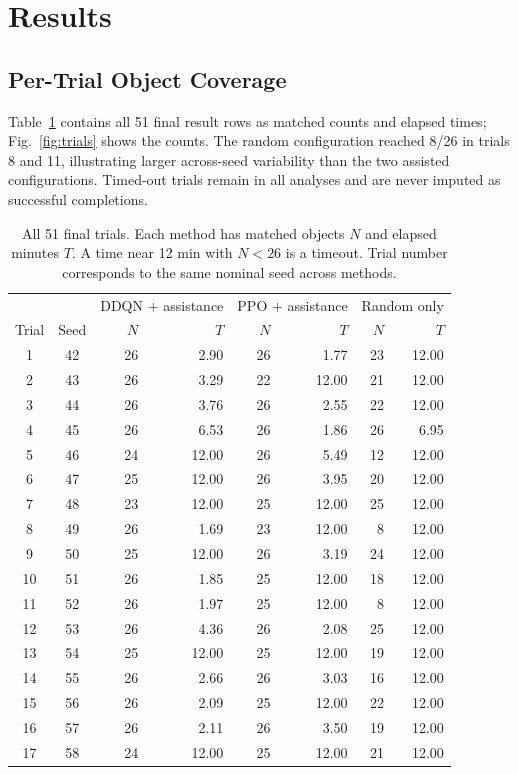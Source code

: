 \documentclass[conference]{IEEEtran}
\begin{document}
\section{Results}
\subsection{Per-Trial Object Coverage}
Table~\ref{tab:trials} contains all 51 final result rows as matched counts and elapsed times; Fig.~\ref{fig:trials} shows the counts. The random configuration reached 8/26 in trials 8 and 11, illustrating larger across-seed variability than the two assisted configurations. Timed-out trials remain in all analyses and are never imputed as successful completions.

\begin{table}[!t]
\caption{All 51 final trials. Each method has matched objects $N$ and elapsed minutes $T$. A time near 12 min with $N<26$ is a timeout. Trial number corresponds to the same nominal seed across methods.}
\label{tab:trials}
\centering\footnotesize
\begin{tabular}{@{}cc rr rr rr@{}}
\toprule
& & \multicolumn{2}{c}{DDQN + assistance} & \multicolumn{2}{c}{PPO + assistance} & \multicolumn{2}{c}{Random only}\\
Trial & Seed & $N$ & $T$ & $N$ & $T$ & $N$ & $T$\\ \midrule
1 & 42 & 26 & 2.90 & 26 & 1.77 & 23 & 12.00\\
2 & 43 & 26 & 3.29 & 22 & 12.00 & 21 & 12.00\\
3 & 44 & 26 & 3.76 & 26 & 2.55 & 22 & 12.00\\
4 & 45 & 26 & 6.53 & 26 & 1.86 & 26 & 6.95\\
5 & 46 & 24 & 12.00 & 26 & 5.49 & 12 & 12.00\\
6 & 47 & 25 & 12.00 & 26 & 3.95 & 20 & 12.00\\
7 & 48 & 23 & 12.00 & 25 & 12.00 & 25 & 12.00\\
8 & 49 & 26 & 1.69 & 23 & 12.00 & 8 & 12.00\\
9 & 50 & 25 & 12.00 & 26 & 3.19 & 24 & 12.00\\
10 & 51 & 26 & 1.85 & 25 & 12.00 & 18 & 12.00\\
11 & 52 & 26 & 1.97 & 25 & 12.00 & 8 & 12.00\\
12 & 53 & 26 & 4.36 & 26 & 2.08 & 25 & 12.00\\
13 & 54 & 25 & 12.00 & 25 & 12.00 & 19 & 12.00\\
14 & 55 & 26 & 2.66 & 26 & 3.03 & 16 & 12.00\\
15 & 56 & 26 & 2.09 & 25 & 12.00 & 22 & 12.00\\
16 & 57 & 26 & 2.11 & 26 & 3.50 & 19 & 12.00\\
17 & 58 & 24 & 12.00 & 25 & 12.00 & 21 & 12.00\\
\bottomrule
\end{tabular}
\end{table}
\end{document}
